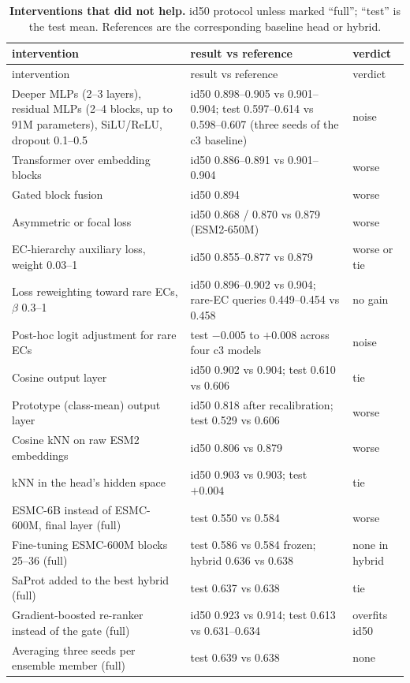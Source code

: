 \documentclass[11pt]{article}
\begin{document}
{\small
\begin{longtable}{@{}p{}p{}p{}@{}}
\caption{\textbf{Interventions that did not help.} id50 protocol unless marked ``full''; ``test'' is the test mean.
References are the corresponding baseline head or hybrid.}
\label{tab:negative}\\
\toprule
intervention & result vs reference & verdict \\
\midrule
\endfirsthead
\toprule
intervention & result vs reference & verdict \\
\midrule
\endhead
Deeper MLPs (2--3 layers), residual MLPs (2--4 blocks, up to 91M parameters), SiLU/ReLU, dropout 0.1--0.5 &
id50 0.898--0.905 vs 0.901--0.904; test 0.597--0.614 vs 0.598--0.607 (three seeds of the c3 baseline) & noise \\
Transformer over embedding blocks & id50 0.886--0.891 vs 0.901--0.904 & worse \\
Gated block fusion & id50 0.894 & worse \\
Asymmetric \cite{asl} or focal \cite{focal} loss & id50 0.868 / 0.870 vs 0.879 (ESM2-650M) & worse \\
EC-hierarchy auxiliary loss, weight 0.03--1 & id50 0.855--0.877 vs 0.879 & worse or tie \\
Loss reweighting toward rare ECs, $\beta$ 0.3--1 & id50 0.896--0.902 vs 0.904; rare-EC queries 0.449--0.454 vs 0.458 & no gain \\
Post-hoc logit adjustment for rare ECs \cite{menon2021} & test $-0.005$ to $+0.008$ across four c3 models & noise \\
Cosine output layer & id50 0.902 vs 0.904; test 0.610 vs 0.606 & tie \\
Prototype (class-mean) output layer \cite{snell2017} & id50 0.818 after recalibration; test 0.529 vs 0.606 & worse \\
Cosine kNN on raw ESM2 embeddings \cite{littmann2021,schutze2022} & id50 0.806 vs 0.879 & worse \\
kNN in the head's hidden space & id50 0.903 vs 0.903; test $+0.004$ & tie \\
ESMC-6B instead of ESMC-600M, final layer (full) & test 0.550 vs 0.584 & worse \\
Fine-tuning ESMC-600M blocks 25--36 (full) & test 0.586 vs 0.584 frozen; hybrid 0.636 vs 0.638 & none in hybrid \\
SaProt added to the best hybrid (full) & test 0.637 vs 0.638 & tie \\
Gradient-boosted re-ranker instead of the gate (full) & id50 0.923 vs 0.914; test 0.613 vs 0.631--0.634 & overfits id50 \\
Averaging three seeds per ensemble member (full) & test 0.639 vs 0.638 & none \\
\bottomrule
\end{longtable}}
\end{document}
